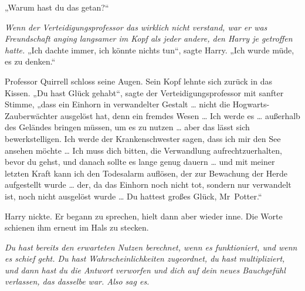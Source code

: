 „Warum hast du das getan?“

\emph{Wenn der Verteidigungsprofessor das wirklich nicht verstand, war er was Freundschaft anging langsamer im Kopf als jeder andere, den Harry je getroffen hatte.}
„Ich dachte immer, ich könnte nichts tun“, sagte Harry.
„Ich wurde müde, es zu denken.“

Professor Quirrell schloss seine Augen. Sein Kopf lehnte sich zurück in das Kissen.
„Du hast Glück gehabt“, sagte der Verteidigungsprofessor mit sanfter Stimme,
„dass ein Einhorn in verwandelter Gestalt … nicht die Hogwarts-Zauberwächter ausgelöst hat, denn ein fremdes Wesen … Ich werde es … außerhalb des Geländes bringen müssen, um es zu nutzen … aber das lässt sich bewerkstelligen. Ich werde der Krankenschwester sagen, dass ich mir den See ansehen möchte … Ich muss dich bitten, die Verwandlung aufrechtzuerhalten, bevor du gehst, und danach sollte es lange genug dauern … und mit meiner letzten Kraft kann ich den Todesalarm auflösen, der zur Bewachung der Herde aufgestellt wurde … der, da das Einhorn noch nicht tot, sondern nur verwandelt ist, noch nicht ausgelöst wurde … Du hattest großes Glück, Mr~Potter.“

Harry nickte. Er begann zu sprechen, hielt dann aber wieder inne. Die Worte schienen ihm erneut im Hals zu stecken.

\emph{Du hast bereits den erwarteten Nutzen berechnet, wenn es funktioniert, und wenn es schief geht. Du hast Wahrscheinlichkeiten zugeordnet, du hast multipliziert, und dann hast du die Antwort verworfen und dich auf dein neues Bauchgefühl verlassen, das dasselbe war. Also sag es.}

